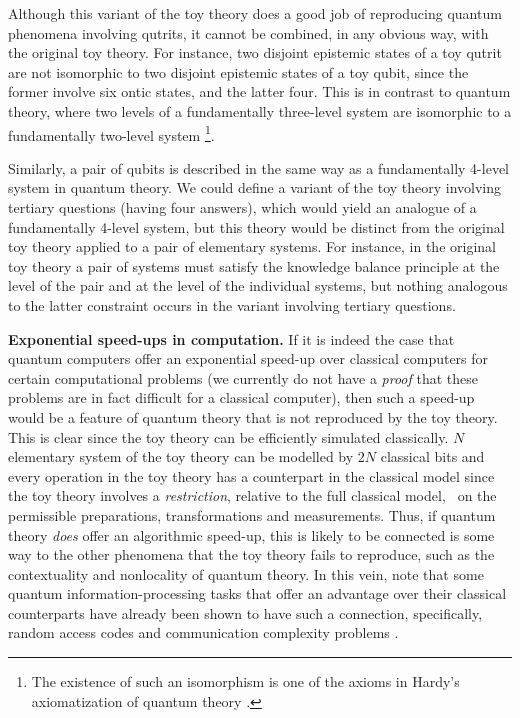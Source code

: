 \documentclass[pra,nofootinbib,showpacs,12pt]{revtex4}
\begin{document}
Although this variant of the toy theory does a good job of reproducing
quantum phenomena involving qutrits, it cannot be combined, in any obvious
way, with the original toy theory. For instance, two disjoint epistemic
states of a toy qutrit are not isomorphic to two disjoint epistemic states
of a toy qubit, since the former involve six ontic states, and the latter
four. This is in contrast to quantum theory, where two levels of a
fundamentally three-level system are isomorphic to a fundamentally two-level
system \footnote{%
The existence of such an isomorphism is one of the axioms in Hardy's
axiomatization of quantum theory \cite{Hardyaxioms}.}.

Similarly, a pair of qubits is described in the same way as a fundamentally
4-level system in quantum theory. We could define a variant of the toy
theory involving tertiary questions (having four answers), which would yield
an analogue of a fundamentally 4-level system, but this theory would be
distinct from the original toy theory applied to a pair of elementary
systems. For instance, in the original toy theory a pair of systems must
satisfy the knowledge balance principle at the level of the pair and at the
level of the individual systems, but nothing analogous to the latter
constraint occurs in the variant involving tertiary questions.

\textbf{Exponential speed-ups in computation. }If it is indeed the case that
quantum computers offer an exponential speed-up over classical computers for
certain computational problems \cite{NielsenChuang} (we currently do not
have a \emph{proof} that these problems are in fact difficult for a
classical computer), then such a speed-up would be a feature of quantum
theory that is not reproduced by the toy theory. This is clear since the toy
theory can be efficiently simulated classically. $N$ elementary system of
the toy theory can be modelled by $2N$ classical bits and every operation in
the toy theory has a counterpart in the classical model since the toy theory
involves a \emph{restriction}, relative to the full classical model,\emph{\ }%
on the permissible preparations, transformations and measurements.
Thus, if quantum theory \emph{does} offer an algorithmic speed-up,
this is likely to be connected is some way to the other phenomena
that the toy theory fails to reproduce, such as the contextuality
and nonlocality of quantum theory. In this vein, note that some
quantum information-processing tasks that offer an advantage over
their classical counterparts have already been
shown to have such a connection, specifically, random access codes \cite%
{Galvao} and communication complexity problems \cite{BZPZ}.
\end{document}
